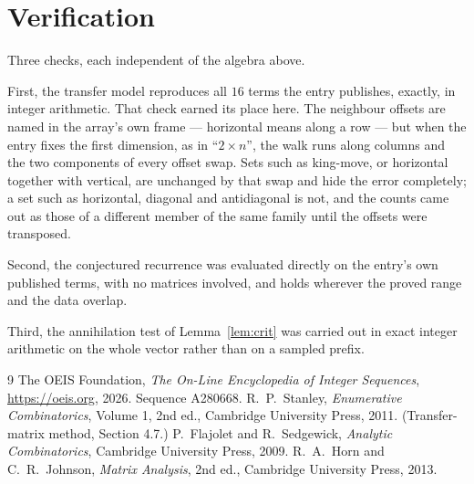 \documentclass[11pt,a4paper]{article}
\theoremstyle{plain}
\theoremstyle{definition}
\begin{document}
\section{Verification}

Three checks, each independent of the algebra above.

First, the transfer model reproduces all $16$ terms the entry publishes, exactly, in
integer arithmetic. That check earned its place here. The neighbour offsets are named in the
array's own frame --- horizontal means along a row --- but when the entry fixes the first
dimension, as in ``$2\times n$'', the walk runs along columns and the two components of every
offset swap. Sets such as king-move, or horizontal together with vertical, are unchanged by
that swap and hide the error completely; a set such as horizontal, diagonal and antidiagonal
is not, and the counts came out as those of a different member of the same family until the
offsets were transposed.

Second, the conjectured recurrence was evaluated directly on the entry's own published terms,
with no matrices involved, and holds wherever the proved range and the data overlap.

Third, the annihilation test of Lemma~\ref{lem:crit} was carried out in exact integer
arithmetic on the whole vector rather than on a sampled prefix.

\begin{thebibliography}{9}
 The OEIS Foundation, \emph{The On-Line Encyclopedia of Integer
Sequences}, \url{https://oeis.org}, 2026. Sequence A280668.
 R.~P.~Stanley, \emph{Enumerative Combinatorics}, Volume 1, 2nd ed.,
Cambridge University Press, 2011. (Transfer-matrix method, Section 4.7.)
 P.~Flajolet and R.~Sedgewick, \emph{Analytic Combinatorics}, Cambridge
University Press, 2009.
 R.~A.~Horn and C.~R.~Johnson, \emph{Matrix Analysis}, 2nd ed., Cambridge
University Press, 2013.
\end{thebibliography}
\end{document}
